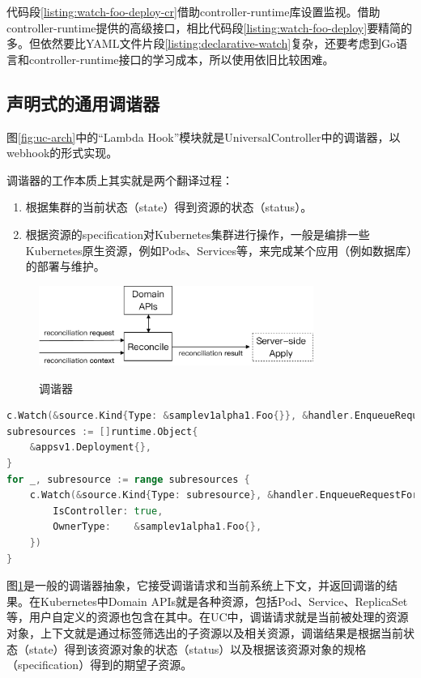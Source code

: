 \documentclass[macfonts,master]{njuthesis}
\begin{document}
代码段\ref{listing:watch-foo-deploy-cr}借助controller-runtime库设置监视。借助controller-runtime提供的高级接口，相比代码段\ref{listing:watch-foo-deploy}要精简的多。但依然要比YAML文件片段\ref{listing:declarative-watch}复杂，还要考虑到Go语言和controller-runtime接口的学习成本，所以使用依旧比较困难。


\subsection{声明式的通用调谐器}
图\ref{fig:uc-arch}中的``Lambda Hook''模块就是UniversalController中的调谐器，以webhook的形式实现。

调谐器的工作本质上其实就是两个翻译过程：
\begin{enumerate}
	\item 根据集群的当前状态（state）得到资源的状态（status）。
	\item 根据资源的specification对Kubernetes集群进行操作，一般是编排一些Kubernetes原生资源，例如Pods、Services等，来完成某个应用（例如数据库）的部署与维护。
\end{enumerate}

\begin{figure}[htbp]
  \centering
  \includegraphics[width= 0.8\textwidth]{pics/reconciler-interface.pdf}\\
  \caption{调谐器}\label{fig:reconciler}
\end{figure}

\begin{lstlisting}[language=Go,caption=controller-runtime版sample-controller中监视Foo和Deployment的代码段,label=listing:watch-foo-deploy-cr]
c.Watch(&source.Kind{Type: &samplev1alpha1.Foo{}}, &handler.EnqueueRequestForObject{})
subresources := []runtime.Object{
    &appsv1.Deployment{},
}
for _, subresource := range subresources {
    c.Watch(&source.Kind{Type: subresource}, &handler.EnqueueRequestForOwner{
        IsController: true,
        OwnerType:    &samplev1alpha1.Foo{},
    })
}
\end{lstlisting}

图\ref{fig:reconciler}是一般的调谐器抽象，它接受调谐请求和当前系统上下文，并返回调谐的结果。在Kubernetes中Domain APIs就是各种资源，包括Pod、Service、ReplicaSet等，用户自定义的资源也包含在其中。在UC中，调谐请求就是当前被处理的资源对象，上下文就是通过标签筛选出的子资源以及相关资源，调谐结果是根据当前状态（state）得到该资源对象的状态（status）以及根据该资源对象的规格（specification）得到的期望子资源。
\end{document}
